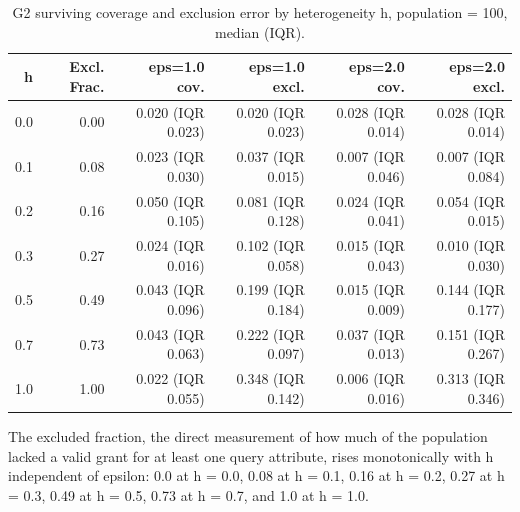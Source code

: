 \begin{table}[H]
\caption{G2 surviving coverage and exclusion error by heterogeneity h, population = 100, median (IQR).\label{tab:t9}}
\small
\begin{tabular}{rrrrrr}
\toprule
h & Excl. Frac. & eps=1.0 cov. & eps=1.0 excl. & eps=2.0 cov. & eps=2.0 excl. \\
\midrule
0.0 & 0.00 & 0.020 (IQR 0.023) & 0.020 (IQR 0.023) & 0.028 (IQR 0.014) & 0.028 (IQR 0.014) \\
0.1 & 0.08 & 0.023 (IQR 0.030) & 0.037 (IQR 0.015) & 0.007 (IQR 0.046) & 0.007 (IQR 0.084) \\
0.2 & 0.16 & 0.050 (IQR 0.105) & 0.081 (IQR 0.128) & 0.024 (IQR 0.041) & 0.054 (IQR 0.015) \\
0.3 & 0.27 & 0.024 (IQR 0.016) & 0.102 (IQR 0.058) & 0.015 (IQR 0.043) & 0.010 (IQR 0.030) \\
0.5 & 0.49 & 0.043 (IQR 0.096) & 0.199 (IQR 0.184) & 0.015 (IQR 0.009) & 0.144 (IQR 0.177) \\
0.7 & 0.73 & 0.043 (IQR 0.063) & 0.222 (IQR 0.097) & 0.037 (IQR 0.013) & 0.151 (IQR 0.267) \\
1.0 & 1.00 & 0.022 (IQR 0.055) & 0.348 (IQR 0.142) & 0.006 (IQR 0.016) & 0.313 (IQR 0.346) \\
\bottomrule
\end{tabular}
\end{table}

The excluded fraction, the direct measurement of how much of the population lacked a valid grant for at least one query attribute, rises monotonically with h independent of epsilon: 0.0 at h = 0.0, 0.08 at h = 0.1, 0.16 at h = 0.2, 0.27 at h = 0.3, 0.49 at h = 0.5, 0.73 at h = 0.7, and 1.0 at h = 1.0.

